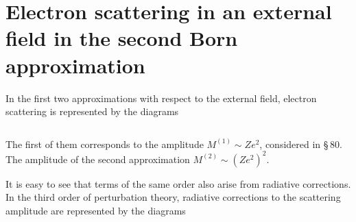 
\section{Electron scattering in an external field in the second Born approximation}


In the first two approximations with respect to the external field, electron scattering is represented by the diagrams


\begin{equation}
\label{eq:121.1}
\end{equation}

\noindent The first of them corresponds to the amplitude $M^{(1)} \sim Ze^2$, considered in \S\,80. The amplitude of the second approximation $M^{(2)} \sim (Ze^2)^2$.


It is easy to see that terms of the same order also arise from radiative corrections. In the third order of perturbation theory, radiative corrections to the scattering amplitude are represented by the diagrams


\begin{equation}
\label{eq:121.2}
\end{equation}


